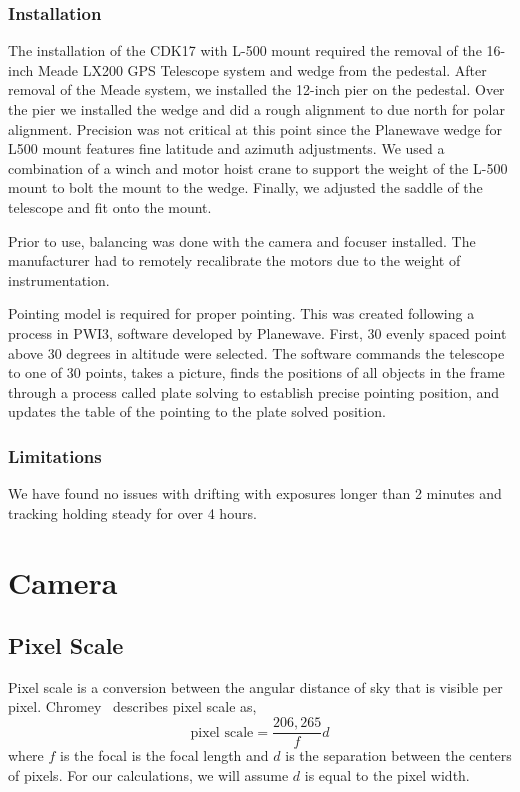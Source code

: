 \subsubsection{Installation}
The installation of the CDK17 with L-500 mount required the removal of the 16-inch Meade LX200 GPS Telescope system and wedge from the pedestal.
After removal of the Meade system, we installed the 12-inch pier on the pedestal.
Over the pier we installed the wedge and did a rough alignment to due north for polar alignment.
Precision was not critical at this point since the Planewave wedge for L500 mount features fine latitude and azimuth adjustments.
We used a combination of a winch and motor hoist crane to support the weight of the L-500 mount to bolt the mount to the wedge.
Finally, we adjusted the saddle of the telescope and fit onto the mount.

Prior to use, balancing was done with the camera and focuser installed.
The manufacturer had to remotely recalibrate the motors due to the weight of instrumentation.

Pointing model is required for proper pointing. This was created following a process in PWI3, software developed by Planewave.
First, 30 evenly spaced point above 30 degrees in altitude were selected. 
The software commands the telescope to one of 30 points, takes a picture,
finds the positions of all objects in the frame through a process called plate solving to establish precise pointing position, and
updates the table of the pointing to the plate solved position.

\subsubsection{Limitations}
We have found no issues with drifting with exposures longer than 2 minutes and tracking holding steady for over 4 hours.

\section{Camera}
\subsection{Pixel Scale}
Pixel scale is a conversion between the angular distance of sky that is visible per pixel.
Chromey~\cite{chromey_2010} describes pixel scale as,
\begin{equation}
    \text{pixel scale} = \frac{206,265}{f} d
    \label{eq:pixelscale}
\end{equation}
where $f$ is the focal is the focal length and $d$ is the separation between the centers of pixels.
For our calculations, we will assume $d$ is equal to the pixel width.

